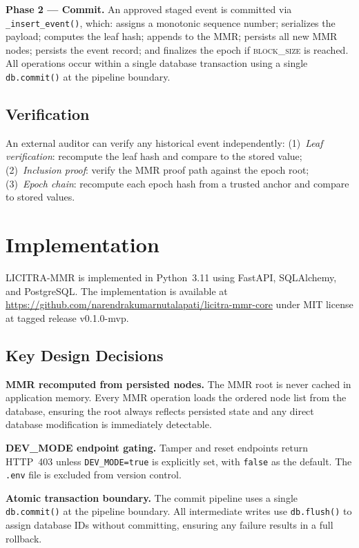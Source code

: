 \documentclass[sigconf,natbib=false]{acmart}
\begin{document}
\textbf{Phase 2 --- Commit.} An approved staged event is committed via
\texttt{\_insert\_event()}, which: assigns a monotonic sequence number;
serializes the payload; computes the leaf hash; appends to the MMR;
persists all new MMR nodes; persists the event record; and finalizes the
epoch if \textsc{block\_size} is reached. All operations occur within a
single database transaction using a single \texttt{db.commit()} at the
pipeline boundary.

\subsection{Verification}

An external auditor can verify any historical event independently:
(1)~\textit{Leaf verification}: recompute the leaf hash and compare to the
stored value; (2)~\textit{Inclusion proof}: verify the MMR proof path
against the epoch root; (3)~\textit{Epoch chain}: recompute each epoch
hash from a trusted anchor and compare to stored values.

\section{Implementation}

LICITRA-MMR is implemented in Python~3.11 using FastAPI, SQLAlchemy, and
PostgreSQL. The implementation is available at
\url{https://github.com/narendrakumarnutalapati/licitra-mmr-core} under MIT
license at tagged release v0.1.0-mvp.

\subsection{Key Design Decisions}

\textbf{MMR recomputed from persisted nodes.} The MMR root is never cached
in application memory. Every MMR operation loads the ordered node list from
the database, ensuring the root always reflects persisted state and any
direct database modification is immediately detectable.

\textbf{DEV\_MODE endpoint gating.} Tamper and reset endpoints return
HTTP~403 unless \texttt{DEV\_MODE=true} is explicitly set, with
\texttt{false} as the default. The \texttt{.env} file is excluded from
version control.

\textbf{Atomic transaction boundary.} The commit pipeline uses a single
\texttt{db.commit()} at the pipeline boundary. All intermediate writes use
\texttt{db.flush()} to assign database IDs without committing, ensuring any
failure results in a full rollback.
\end{document}
